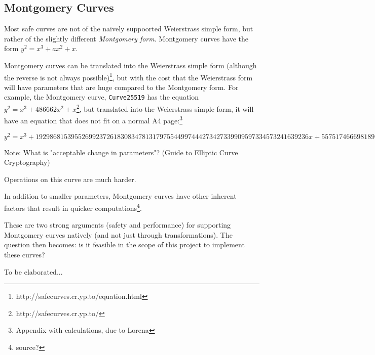 \subsection{Montgomery Curves}

Most safe curves are not of the naively suppoorted
Weierstrass simple form, but rather of the slightly different \emph{Montgomery form}. Montgomery curves
have the form \(y^2 = x^3 + ax^2 + x\).

Montgomery curves can be translated into the Weierstrass simple form (although the reverse is not always
possible)\footnote{http://safecurves.cr.yp.to/equation.html}, but with the cost that the Weierstrass form
will have parameters that are huge compared to the Montgomery form. For example, the Montgomery curve,
\verb|Curve25519| has the equation \(y^2 = x^3+486662x^2+x\)\footnote{http://safecurves.cr.yp.to/}, but
translated into the Weierstrass simple form, it will have an equation that does not fit on a normal A4
page:\footnote{Appendix with calculations, due to Lorena}

\(y^2 = x^3 + 19298681539552699237261830834781317975544997444273427339909597334573241639236x + 55751746669818908907645289078257140818241103727901012315294400837956729358436\)

Note: What is "acceptable change in parameters"? (Guide to Elliptic Curve Cryptography)

Operations on this curve are much harder.

In addition to smaller parameters, Montgomery curves have other inherent factors that result in quicker
computations\footnote{source?}.

These are two strong arguments (safety and performance) for supporting Montgomery curves natively (and
not just through transformations). The question then becomes: is it feasible in the scope of this
project to implement these curves?

To be elaborated...